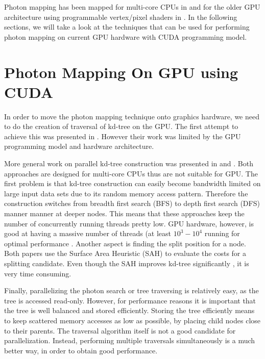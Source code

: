 Photon mapping has been mapped for multi-core CPUs in \cite{gunther:realtime} and for the older GPU architecture using programmable vertex/pixel shaders in \cite{Purcell:2005:PMP:1198555.1198797}. In the following sections, we will take a look at the techniques that can
be used for performing photon mapping on current GPU hardware with CUDA programming model.


\section{Photon Mapping On GPU using CUDA}

In order to move the photon mapping technique onto graphics hardware, we need to do the creation of traversal of kd-tree on the GPU. The first attempt to achieve this was presented in \cite{Purcell:2005:PMP:1198555.1198797}. However their work was limited by the GPU programming model and hardware architecture.

More general work on parallel kd-tree construction was presented in \cite{popov:06:ESC} and \cite{Shevtsov_highlyparallel}. Both approaches are designed for multi-core CPUs thus are not suitable for GPU. The first problem is that kd-tree construction can easily become bandwidth limited on large input data sets due to its random memory access pattern. Therefore the construction switches from breadth first search (BFS) to depth first search (DFS) manner manner at deeper nodes. This means that these approaches keep the number of concurrently running threads pretty low. GPU hardware, however, is good at having a massive number of threads (at least \(10^{3} - 10^{4}\) running for optimal performance \cite{Guide2012}.
Another aspect is finding the split position for a node. Both papers use the Surface Area Heuristic (SAH) \cite{springerlink:10.1007/BF01911006} to evaluate the costs for a splitting candidate. Even though the SAH improves kd-tree significantly \cite{wald::PhD}, it is very time consuming.

Finally, parallelizing the photon search or tree traversing is relatively easy, as the tree is accessed read-only. However, for performance reasons it is important that the tree is well balanced and stored efficiently. Storing the tree efficiently means to keep scattered memory accesses as low as possible, by placing child nodes close to their parents. The traversal algorithm itself is not a good candidate for parallelization. Instead, performing multiple traversals simultaneously is a much better way, in order to obtain good performance.

